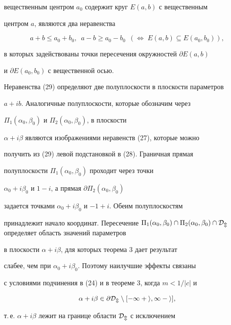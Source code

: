 вещественным центром $a_0$ содержит круг $E(a,b)$ с вещественным 


центром $a$, являются два неравенства 


\begin{equation} 


a+b\le a_0+b_0,\ \; a-b\ge a_0-b_0\ \; (\Leftrightarrow\; 


E(a,b)\subseteq E(a_0,b_0)), 


\end{equation} 


в которых задействованы точки пересечения окружностей $\partial E(a,b)$ 


и $\partial E(a_0,b_0)$ с вещественной осью. 


 


Неравенства (29) определяют две полуплоскости в плоскости параметров 


$a+ib$. Аналогичные полуплоскости, которые обозначим через 


$\Pi_1(\alpha_0,\beta_0)$ и $\Pi_2(\alpha_0,\beta_0)$, в плоскости 


$\alpha+i\beta$ являются изображениями неравенств (27), которые можно 


получить из (29) левой подстановкой в (28). Граничная прямая 


полуплоскости $\Pi_1(\alpha_0,\beta_0)$ проходит через точки 


$\alpha_0+i\beta_0$ и $1-i$, а прямая $\partial\Pi_2(\alpha_0,\beta_0)$ 


задается точками $\alpha_0+i\beta_0$ и $-1+i$. Обеим полуплоскостям 


принадлежит начало координат. Пересечение $\Pi_1(\alpha_0,\beta_0)\cap 


\Pi_2(\alpha_0,\beta_0)\cap \cal D_m$ определяет область значений параметров 


в плоскости $\alpha+i\beta$, для которых теорема 3 дает результат 


слабее, чем при $\alpha_0+i\beta_0$. Поэтому наилучшие эффекты связаны 


с условиями подчинения в (24) и в теореме 3, когда $m<1/|c|$ и


\begin{equation} 


\alpha+i\beta\in\partial \cal D_m\setminus[-1+i,1-i], 


\end{equation} 


т.\,е. $\alpha+i\beta$ лежит на границе области $\cal D_m$ с исключением 


